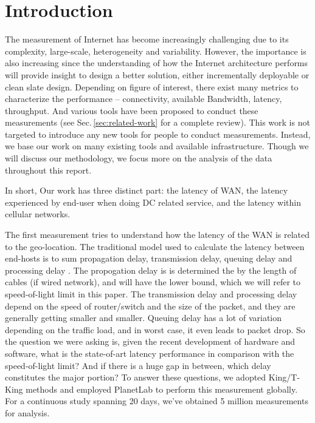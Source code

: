 \section{Introduction}
\label{sec:introduction}

The measurement of Internet has become increasingly challenging due to its complexity, large-scale, heterogeneity and variability. However, the importance is also increasing since the understanding of how the Internet architecture performs will provide insight to design a better solution, either incrementally deployable or clean slate design. Depending on figure of interest, there exist many metrics to characterize the performance -- connectivity, available Bandwidth, latency, throughput. And various tools have been proposed to conduct these measurements (see Sec.\,\ref{sec:related-work} for a complete review). This work is not targeted to introduce any new tools for people to conduct measurements. Instead, we base our work on many existing tools and available infrastructure. Though we will discuss our methodology, we focus more on the analysis of the data throughout this report.

In short, Our work has three distinct part: the latency of WAN, the latency experienced by end-user when doing DC related service, and the latency within cellular networks.

The first measurement tries to understand how the latency of the WAN is related to the geo-location. The traditional model used to calculate the latency between end-hosts is to sum propagation delay, transmission delay, queuing delay and processing delay \cite{kurose2001computer}. The propogation delay is is determined the by the length of cables (if wired network), and will have the lower bound, which we will refer to speed-of-light limit in this paper. The transmission delay and processing delay depend on the speed of router/switch and the size of the packet, and they are generally getting smaller and smaller. Queuing delay has a lot of variation depending on the traffic load, and in worst case, it even leads to packet drop. So the question we were asking is, given the recent development of hardware and software, what is the state-of-art latency performance in comparison with the speed-of-light limit? And if there is a huge gap in between, which delay constitutes the major portion? To answer these questions, we adopted King/T-King \cite{gummadi2002king, leonard2008turbo} methods and employed PlanetLab \cite{chun2003planetlab} to perform this measurement globally. For a continuous study spanning 20 days, we've obtained 5 million measurements for analysis.

